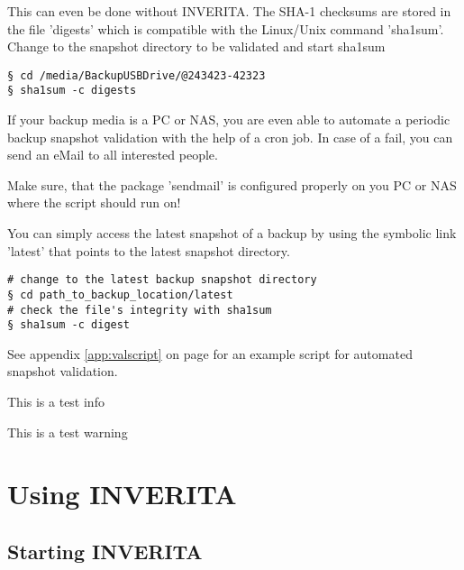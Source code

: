 This can even be done without INVERITA. The SHA-1 checksums are stored
in the file 'digests' which is compatible with the Linux/Unix command 'sha1sum'.
Change to the snapshot directory to be validated and start sha1sum

\begin{lstlisting}[style=console]
§ cd /media/BackupUSBDrive/@243423-42323
§ sha1sum -c digests
\end{lstlisting}

If your backup media is a PC or NAS, you are even able to automate a periodic
backup snapshot validation with the help of a cron job. In case of a fail,
you can send an eMail to all interested people.

Make sure, that the package 'sendmail' is configured properly on you PC or NAS
where the script should run on!

\begin{info}
You can simply access the latest snapshot of a backup by using the
symbolic link 'latest' that points to the latest snapshot directory.
\end{info}

\begin{lstlisting}[style=console]
# change to the latest backup snapshot directory
§ cd path_to_backup_location/latest   
# check the file's integrity with sha1sum
§ sha1sum -c digest
\end{lstlisting}

See appendix \ref{app:valscript} on page \pageref{app:fdl} for an example script for automated
snapshot validation.


\begin{info}
This is a test info
\end{info}

\begin{warning}
This is a test warning
\end{warning}

\chapter{Using INVERITA}

\section{Starting INVERITA}

